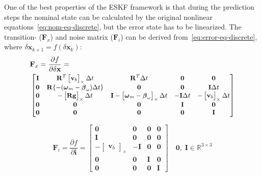 One of the best properties of the ESKF framework is that during the prediction steps the nominal state can be calculated by the original nonlinear equations~\eqref{eq:nom-eq-discrete}, but the error state has to be linearized. The transition- ($\mathbf{F}_x$) and noise matrix ($\mathbf{F}_i$) can be derived from~\eqref{eq:error-eq-discrete}, where $\delta\mathbf{x}_{k+1}=f(\delta\mathbf{x}_k)$:
\begin{equation}
\begin{aligned}
     &\mathbf{F}_x=\frac{\partial f}{\partial\delta\mathbf{x}}= \\  
     & \small \begin{bmatrix}
        \mathbf{I} & \mathbf{R}^T\begin{bmatrix}\mathbf{v}_{b}\end{bmatrix}_\times\Delta t & \mathbf{R}^T\Delta t & \mathbf{0} & \mathbf{0} \\
        \mathbf{0} & \mathbf{R}\{-(\boldsymbol{\omega}_{m}-\boldsymbol{\beta}_{\omega})\Delta t\} & \mathbf{0} & \mathbf{0} & \mathbf{I}\Delta t \\
        \mathbf{0} & -\begin{bmatrix}\mathbf{R}\mathbf{g}\end{bmatrix}_\times\Delta t & \mathbf{I}-\begin{bmatrix} \boldsymbol{\omega}_{m}-\boldsymbol{\beta}_{\omega}\end{bmatrix}_\times\Delta t & -\mathbf{I}\Delta t & -\begin{bmatrix} \mathbf{v}_{b}\end{bmatrix}_\times\Delta t \\
        \mathbf{0} & \mathbf{0} & \mathbf{0} & \mathbf{I} & \mathbf{0} \\
        \mathbf{0} & \mathbf{0} & \mathbf{0} & \mathbf{0} & \mathbf{I}
    \end{bmatrix}
\end{aligned}
\end{equation}

\begin{equation}
    \mathbf{F}_i=\frac{\partial f}{\partial \mathbf{i}}=\begin{bmatrix}
         \mathbf{0} & \mathbf{0} & \mathbf{0} & \mathbf{0} \\
         \mathbf{I} & \mathbf{0} & \mathbf{0} & \mathbf{0} \\
         -\begin{bmatrix}
             \mathbf{v}_{b}
         \end{bmatrix}_\times & -\mathbf{I} & \mathbf{0} & \mathbf{0} \\
         \mathbf{0} & \mathbf{0} & \mathbf{I} & \mathbf{0} \\
         \mathbf{0} & \mathbf{0} & \mathbf{0} & \mathbf{I}
    \end{bmatrix} \quad \mathbf{0},\; \mathbf{I}\in\mathbb{R}^{3\times 3}
\end{equation}

